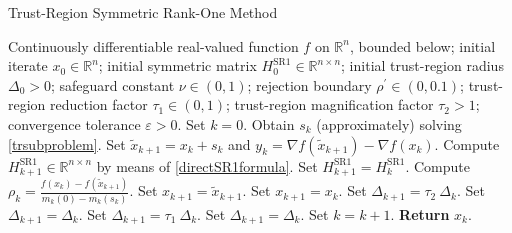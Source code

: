 \begin{algorithm}[H]
    \caption{Trust-Region Symmetric Rank-One Method}\label{TR-SR1Method}
    \begin{algorithmic}[1]
        \State Continuously differentiable real-valued function $f$ on $\mathbb{R}^n$, bounded below; initial iterate $x_0 \in \mathbb{R}^n$; initial symmetric matrix $H^{\mathrm{SR1}}_0 \in \mathbb{R}^{n \times n}$; initial trust-region radius $\Delta_0 > 0$; safeguard constant $\nu \in (0,1)$; rejection boundary $\rho^{\prime} \in (0, 0.1)$; trust-region reduction factor $\tau_1 \in (0,1)$; trust-region magnification factor $\tau_2 > 1$; convergence tolerance $\varepsilon > 0$. Set $k = 0$.
            \State Obtain $s_k$ (approximately) solving \cref{trsubproblem}.
            \State Set $\widetilde{x}_{k+1} = x_k + s_k$ and $y_k = \nabla f(\widetilde{x}_{k+1}) - \nabla f(x_k)$.
             \label{SR1ApproxUpdate}
                \State Compute $H^{\mathrm{SR1}}_{k+1} \in \mathbb{R}^{n \times n}$ by means of \cref{directSR1formula}. 
			\Else 
				\State Set $H^{\mathrm{SR1}}_{k+1} = H^{\mathrm{SR1}}_k$.
            \EndIf 
            \State Compute $\rho_k = \frac{f(x_k) - f(\widetilde{x}_{k+1})}{m_k(0) - m_k(s_k)}$.
             \label{SR1IterateUpdate}
                \State Set $x_{k+1} = \widetilde{x}_{k+1}$.
			\Else 
				\State Set $x_{k+1} = x_k$.
            \EndIf 
                    \State Set $\Delta_{k+1} = \tau_2 \ \Delta_k$.
                \Else 
                    \State Set $\Delta_{k+1} = \Delta_k$.
                \EndIf 
			\Else 
                    \State Set $\Delta_{k+1} = \tau_1 \ \Delta_k$.
                \Else 
                    \State Set $\Delta_{k+1} = \Delta_k$.
                \EndIf 
            \EndIf 
            \State Set $k = k+1$.
        \EndWhile
        \State \textbf{Return} $x_k$.
    \end{algorithmic}
\end{algorithm}

